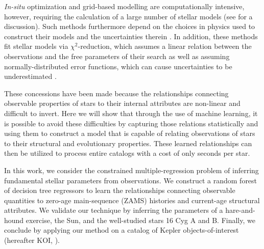 \documentclass[manuscript]{aastex}
\begin{document}
\emph{In-situ} optimization and grid-based modelling are computationally intensive, however, requiring the calculation of a large number of stellar models (see \citealt{2009ApJ...699..373M} for a discussion). Such methods furthermore depend on the choices in physics used to construct their models and the uncertainties therein \citep{2014A&A...569A..21L}. In addition, these methods fit stellar models via $\chi^2$-reduction, which assumes a linear relation between the observations and the free parameters of their search as well as assuming normally-distributed error functions, which can cause uncertainties to be underestimated \citep{2010arXiv1012.3754A}.

These concessions have been made because the relationships connecting observable properties of stars to their internal attributes are non-linear and difficult to invert. Here we will show that through the use of machine learning, it is possible to avoid these difficulties by capturing those relations statistically and using them to construct a model that is capable of relating observations of stars to their structural and evolutionary properties. These learned relationships can then be utilized to process entire catalogs with a cost of only seconds per star. 

In this work, we consider the constrained multiple-regression problem of inferring fundamental stellar parameters from observations. We construct a random forest of decision tree regressors to learn the relationships connecting observable quantities to zero-age main-sequence (ZAMS) histories and current-age structural attributes. We validate our technique by inferring the parameters of a hare-and-hound exercise, the Sun, and the well-studied stars 16 Cyg A and B. Finally, we conclude by applying our method on a catalog of Kepler objects-of-interest (hereafter KOI, \citealt{2016MNRAS.456.2183D}).
\end{document}

